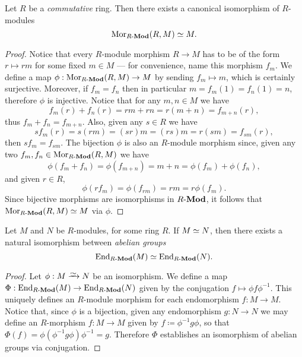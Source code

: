 \begin{proposition}
\label{prop:Mor(R,M)-iso-M-for-commutative-R}
Let \(R\) be a \emph{commutative} ring. Then there exists a canonical
isomorphism of \(R\)-modules
\[
\operatorname{Mor}_{{R\text{-}\textbf{Mod}}}(R, M) \simeq M.
\]
\end{proposition}

\begin{proof}
Notice that every \(R\)-module morphism \(R \to M\) has to be of the form
\(r \mapsto r m\) for some fixed \(m \in M\) --- for convenience, name this
morphism \(f_m\). We define a map \(\phi: \operatorname{Mor}_{{R\text{-}\textbf{Mod}}}(R, M) \to M\) by
sending \(f_m \mapsto m\), which is certainly surjective. Moreover, if
\(f_m = f_n\) then in particular \(m = f_m(1) = f_n(1) = n\), therefore \(\phi\)
is injective. Notice that for any \(m, n \in M\) we have
\[
f_m(r) + f_n(r) = r m + r n = r(m + n) = f_{m + n}(r),
\]
thus \(f_m + f_n = f_{m + n}\). Also, given any \(s \in R\) we have
\[
s f_m(r) = s (r m) = (s r) m = (r s) m = r (s m) = f_{s m}(r),
\]
then \(s f_m = f_{s m}\).  The bijection \(\phi\) is also an \(R\)-module
morphism since, given any two \(f_m, f_n \in \operatorname{Mor}_{{R\text{-}\textbf{Mod}}}(R, M)\) we have
\[
\phi(f_m + f_n) = \phi(f_{m + n}) = m + n = \phi(f_m) + \phi(f_n),
\]
and given \(r \in R\),
\[
\phi(r f_m) = \phi(f_{r m}) = r m = r \phi(f_m).
\]
Since bijective morphisms are isomorphisms in \({R\text{-}\textbf{Mod}}\), it follows that
\(\operatorname{Mor}_{{R\text{-}\textbf{Mod}}}(R, M) \simeq M\) via \(\phi\).
\end{proof}

\begin{proposition}
\label{prop:M-iso-N-then-iso-between-End}
Let \(M\) and \(N\) be \(R\)-modules, for some ring \(R\). If \(M \simeq N\), then
there exists a natural isomorphism between \emph{abelian groups}
\[
\operatorname{End}_{{R\text{-}\textbf{Mod}}}(M) \simeq \operatorname{End}_{{R\text{-}\textbf{Mod}}}(N).
\]
\end{proposition}

\begin{proof}
Let \(\phi: M \isoto N\) be an isomorphism. We define a map
\(\Phi: \operatorname{End}_{{R\text{-}\textbf{Mod}}}(M) \to \operatorname{End}_{{R\text{-}\textbf{Mod}}}(N)\) given by the conjugation \(f
\mapsto \phi f \phi^{-1}\). This uniquely defines an \(R\)-module morphism for
each endomorphism \(f: M \to M\). Notice that, since \(\phi\) is a bijection,
given any endomorphism \(g: N \to N\) we may define an \(R\)-morphism \(f: M \to
M\) given by \(f \coloneq \phi^{-1} g \phi\), so that \(\Phi(f) = \phi
(\phi^{-1} g \phi) \phi^{-1} = g\). Therefore \(\Phi\) establishes an isomorphism
of abelian groups via conjugation.
\end{proof}

